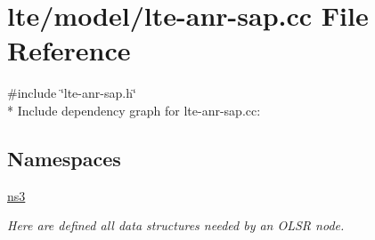 \hypertarget{lte-anr-sap_8cc}{}\section{lte/model/lte-\/anr-\/sap.cc File Reference}
\label{lte-anr-sap_8cc}
{\ttfamily \#include \char`\"{}lte-\/anr-\/sap.\+h\char`\"{}}\\*
Include dependency graph for lte-\/anr-\/sap.cc\+:
\subsection*{Namespaces}
\begin{DoxyCompactItemize}
\item 
 \hyperlink{namespacens3}{ns3}
\begin{DoxyCompactList}\small\item\em Here are defined all data structures needed by an O\+L\+SR node. \end{DoxyCompactList}\end{DoxyCompactItemize}
